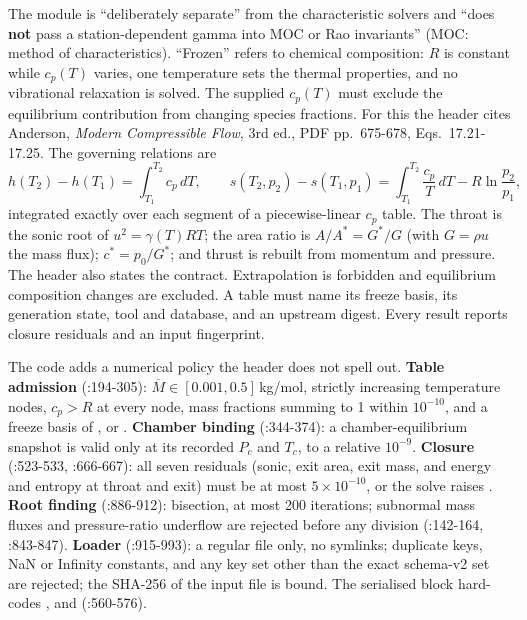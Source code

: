 The module is ``deliberately separate'' from the characteristic solvers and ``does \textbf{not} pass a station-dependent gamma into MOC or Rao invariants'' (MOC: method of characteristics). ``Frozen'' refers to chemical composition: $R$ is constant while $c_p(T)$ varies, one temperature sets the thermal properties, and no vibrational relaxation is solved. The supplied $c_p(T)$ must exclude the equilibrium contribution from changing species fractions. For this the header cites Anderson, \emph{Modern Compressible Flow}, 3rd ed., PDF pp.\ 675-678, Eqs.\ 17.21-17.25. The governing relations are
\[
h(T_2)-h(T_1)=\int_{T_1}^{T_2} c_p\,dT,\qquad
s(T_2,p_2)-s(T_1,p_1)=\int_{T_1}^{T_2}\frac{c_p}{T}\,dT-R\ln\frac{p_2}{p_1},
\]
integrated exactly over each segment of a piecewise-linear $c_p$ table. The throat is the sonic root of $u^2=\gamma(T)RT$; the area ratio is $A/A^*=G^*/G$ (with $G=\rho u$ the mass flux); $c^*=p_0/G^*$; and thrust is rebuilt from momentum and pressure. The header also states the contract. Extrapolation is forbidden and equilibrium composition changes are excluded. A table must name its freeze basis, its generation state, tool and database, and an upstream digest. Every result reports closure residuals and an input fingerprint.

The code adds a numerical policy the header does not spell out. \textbf{Table admission} (:194-305): $\overline{M}\in[0.001, 0.5]$\,kg/mol, strictly increasing temperature nodes, $c_p > R$ at every node, mass fractions summing to 1 within $10^{-10}$, and a freeze basis of ,  or . \textbf{Chamber binding} (:344-374): a chamber-equilibrium snapshot is valid only at its recorded $P_c$ and $T_c$, to a relative $10^{-9}$. \textbf{Closure} (:523-533, :666-667): all seven residuals (sonic, exit area, exit mass, and energy and entropy at throat and exit) must be at most $5\times10^{-10}$, or the solve raises . \textbf{Root finding} (:886-912): bisection, at most 200 iterations; subnormal mass fluxes and pressure-ratio underflow are rejected before any division (:142-164, :843-847). \textbf{Loader} (:915-993): a regular file only, no symlinks; duplicate keys, NaN or Infinity constants, and any key set other than the exact schema-v2 set are rejected; the SHA-256 of the input file is bound. The serialised  block hard-codes ,  and  (:560-576).

